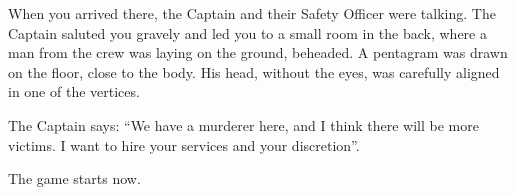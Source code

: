 \documentclass[11pt]{article}
\begin{document}
When you arrived there, the Captain and their Safety Officer were talking. The Captain saluted you gravely and led you to a small room in the back, where a man from the crew was laying on the ground, beheaded. A pentagram was drawn on the floor, close to the body. His head, without the eyes, was carefully aligned in one of the vertices.

The Captain says: \enquote{We have a murderer here, and I think there will be more victims. I want to hire your services and your discretion}.

The game starts now.
\end{document}
